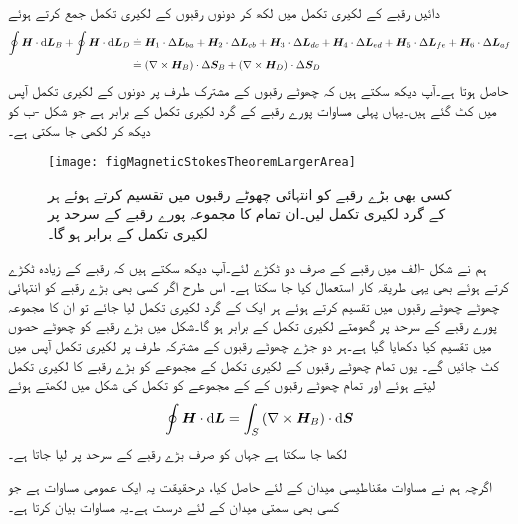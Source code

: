 دائیں رقبے کے لکیری تکمل میں  لکھ کر دونوں رقبوں کے لکیری تکمل جمع کرتے ہوئے
\begin{align*}
\oint \kvec{H} \cdot \dif \kvec{L}_B+\oint \kvec{H} \cdot \dif \kvec{L}_D&\overset{.}{=} \kvec{H}_1 \cdot \Delta\kvec{L}_{ba}+\kvec{H}_2 \cdot \Delta\kvec{L}_{cb}+ \kvec{H}_3 \cdot \Delta\kvec{L}_{dc}+ \kvec{H}_4 \cdot \Delta\kvec{L}_{ed}+ \kvec{H}_5 \cdot \Delta\kvec{L}_{fe}+ \kvec{H}_6 \cdot \Delta\kvec{L}_{af}\\
&\overset{.}{=}\left(\nabla \times \kvec{H}_B \right) \cdot  \Delta \kvec{S}_B+\left(\nabla \times \kvec{H}_D \right) \cdot  \Delta \kvec{S}_D
\end{align*}
حاصل ہوتا ہے۔آپ دیکھ سکتے ہیں کہ چھوٹے رقبوں کے مشترک طرف  پر دونوں  کے لکیری تکمل آپس میں کٹ گئے ہیں۔یہاں پہلی مساوات پورے رقبے کے گرد لکیری تکمل کے برابر ہے جو شکل -ب کو دیکھ کر لکھی جا سکتی ہے۔
\begin{figure}
\centering
\texttt{[image: figMagneticStokesTheoremLargerArea]}
\caption{کسی بھی بڑے رقبے کو انتہائی چھوٹے رقبوں میں تقسیم کرتے ہوئے ہر کے گرد لکیری تکمل لیں۔ان تمام کا مجموعہ پورے رقبے کے سرحد پر لکیری تکمل کے برابر ہو گا۔}
\label{شکل_مقنقطیسی_سٹوکس_بڑا_رقبہ}
\end{figure}
ہم نے شکل -الف میں رقبے کے صرف دو ٹکڑے لئے۔آپ دیکھ سکتے ہیں کہ رقبے کے زیادہ ٹکڑے کرتے ہوئے  بھی یہی طریقہ کار استعمال کیا جا سکتا ہے۔  اس طرح اگر کسی بھی بڑے رقبے کو انتہائی چھوٹے چھوٹے  رقبوں میں تقسیم کرتے ہوئے ہر ایک کے گرد لکیری تکمل لیا جائے  تو ان کا مجموعہ  پورے رقبے کے سرحد پر گھومتے لکیری تکمل کے برابر ہو گا۔شکل  میں بڑے رقبے کو چھوٹے حصوں میں تقسیم کیا دکھایا گیا ہے۔ہر دو جڑے چھوٹے رقبوں کے مشترکہ طرف پر لکیری تکمل آپس میں کٹ جائیں گے۔ یوں تمام چھوٹے رقبوں کے لکیری تکمل کے مجموعے کو بڑے رقبے کا لکیری تکمل لیتے ہوئے اور تمام چھوٹے رقبوں کے  کے مجموعے کو تکمل کی شکل میں لکھتے ہوئے
\begin{align}\label{مساوات_مقناطیسی_سٹوکس_مساوات}
\oint \kvec{H} \cdot \dif \kvec{L} =\int_S \left(\nabla \times \kvec{H}_B \right) \cdot  \dif \kvec{S}
\end{align}
لکھا جا سکتا ہے جہاں  کو صرف بڑے رقبے  کے سرحد پر لیا جاتا ہے۔

اگرچہ ہم نے مساوات  مقناطیسی میدان کے لئے حاصل کیا، درحقیقت یہ ایک عمومی مساوات ہے جو کسی بھی سمتی میدان کے لئے درست ہے۔یہ مساوات  بیان کرتا ہے۔

